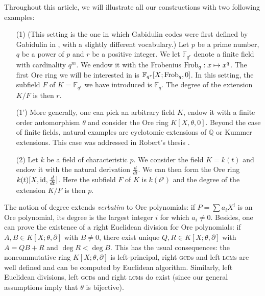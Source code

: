 \documentclass[a4paper]{llncs}
\newcommand{\QQ}{\mathbb Q}
\newcommand{\FF}{\mathbb F}
\newcommand{\id}{\textrm{\rm id}}
\newcommand{\Frob}{\textrm{\rm Frob}}
\begin{document}
\begin{example}
\label{ex:Ore}
Throughout this article, we will illustrate all our constructions 
with two following examples:
\begin{itemize}
\renewcommand{\itemsep}{1ex}
\item[(1)] (This setting is the one in which Gabidulin codes were
first defined by Gabidulin in \cite{gabidulin}, with a slightly different
vocabulary.)
Let $p$ be a prime number, $q$ be a power of $p$ and $r$
be a positive integer. We let $\FF_{q^r}$ denote a finite field
with cardinality $q^m$. We endow it with the Frobenius $\Frob_q :
x \mapsto x^q$. The first Ore ring we will be interested in is
$\FF_{q^r}[X ; \Frob_q, 0]$. In this setting, the subfield $F$ of 
$K = \FF_{q^r}$ we have introduced is $\FF_q$. The degree of the
extension $K/F$ is then $r$.
\item[(1')] More generally, one can pick an arbitrary field $K$,
endow it with a finite order automorphism $\theta$ and consider the
Ore ring $K[X,\theta,0]$. Beyond the case of finite fields, natural
examples are cyclotomic extensions of $\QQ$ or Kummer extensions.
This case was addressed in Robert's thesis \cite{robert}.
\item[(2)] Let $k$ be a field of characteristic $p$. We consider the field 
$K = k(t)$ and endow it with the natural derivation $\frac d{dt}$. We can 
then form the Ore ring $k(t)[X,\id,\frac d{dt}]$. Here the subfield $F$ 
of $K$ is $k(t^p)$ and the degree of the extension $K/F$ is then $p$.
\end{itemize}
\end{example}


The notion of degree extends \emph{verbatim} to Ore polynomials: if $P = 
\sum a_iX^i$ is an Ore polynomial, its degree is the largest integer $i$ 
for which $a_i \neq 0$.
Besides, one can prove the existence of a right Euclidean division for 
Ore polynomials: if $A, B \in K[X;\theta,\partial]$ with $B \neq 0$, 
there exist unique $Q, R \in K[X;\theta,\partial]$ with $A = QB+R$ and 
$\deg R < \deg B$. This has the usual consequences: the noncommutative
ring $K[X;\theta,\partial]$ is left-principal, right \textsc{gcd}s and
left \textsc{lcm}s are well defined and can be computed by Euclidean
algorithm. 
Similarly, left Euclidean divisions, left \textsc{gcd}s and right 
\textsc{lcm}s do exist (since our general assumptions imply that
$\theta$ is bijective).
\end{document}
